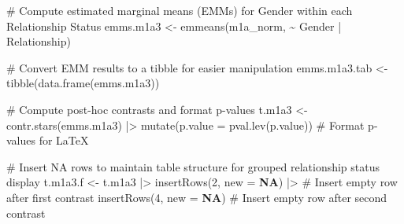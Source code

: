 \documentclass[
  bookmarksnumbered]{article}
\newenvironment{Shaded}{\begin{snugshade}}{\end{snugshade}}
\newcommand{\AttributeTok}[1]{\textcolor[rgb]{0.80,0.80,0.80}{#1}}
\newcommand{\CommentTok}[1]{\textcolor[rgb]{0.50,0.62,0.50}{#1}}
\newcommand{\ConstantTok}[1]{\textcolor[rgb]{0.86,0.64,0.64}{\textbf{#1}}}
\newcommand{\DecValTok}[1]{\textcolor[rgb]{0.86,0.86,0.80}{#1}}
\newcommand{\FunctionTok}[1]{\textcolor[rgb]{0.94,0.94,0.56}{#1}}
\newcommand{\NormalTok}[1]{\textcolor[rgb]{0.80,0.80,0.80}{#1}}
\newcommand{\OtherTok}[1]{\textcolor[rgb]{0.94,0.94,0.56}{#1}}
\newcommand{\SpecialCharTok}[1]{\textcolor[rgb]{0.86,0.64,0.64}{#1}}
\begin{document}
\begin{Shaded}
\begin{Highlighting}[]
\CommentTok{\# Compute estimated marginal means (EMMs) for Gender within each Relationship Status}
\NormalTok{emms.m1a3 }\OtherTok{\textless{}{-}} \FunctionTok{emmeans}\NormalTok{(m1a\_norm, }\SpecialCharTok{\textasciitilde{}}\NormalTok{ Gender }\SpecialCharTok{|}\NormalTok{ Relationship)}

\CommentTok{\# Convert EMM results to a tibble for easier manipulation}
\NormalTok{emms.m1a3.tab }\OtherTok{\textless{}{-}} \FunctionTok{tibble}\NormalTok{(}\FunctionTok{data.frame}\NormalTok{(emms.m1a3))}

\CommentTok{\# Compute post{-}hoc contrasts and format p{-}values}
\NormalTok{t.m1a3 }\OtherTok{\textless{}{-}} \FunctionTok{contr.stars}\NormalTok{(emms.m1a3) }\SpecialCharTok{|\textgreater{}}
  \FunctionTok{mutate}\NormalTok{(}\AttributeTok{p.value =} \FunctionTok{pval.lev}\NormalTok{(p.value)) }\CommentTok{\# Format p{-}values for LaTeX}

\CommentTok{\# Insert NA rows to maintain table structure for grouped relationship status display}
\NormalTok{t.m1a3.f }\OtherTok{\textless{}{-}}\NormalTok{ t.m1a3 }\SpecialCharTok{|\textgreater{}}
  \FunctionTok{insertRows}\NormalTok{(}\DecValTok{2}\NormalTok{, }\AttributeTok{new =} \ConstantTok{NA}\NormalTok{) }\SpecialCharTok{|\textgreater{}} \CommentTok{\# Insert empty row after first contrast}
  \FunctionTok{insertRows}\NormalTok{(}\DecValTok{4}\NormalTok{, }\AttributeTok{new =} \ConstantTok{NA}\NormalTok{) }\CommentTok{\# Insert empty row after second contrast}


\end{Highlighting}
\end{Shaded}
\end{document}
